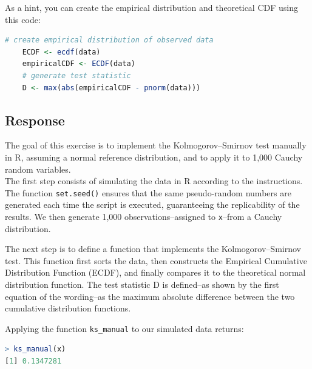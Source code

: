 \documentclass[12pt,letterpaper]{article}
\begin{document}
	
\noindent As a hint, you can create the empirical distribution and theoretical CDF using this code:

\begin{lstlisting}[language=R]
	# create empirical distribution of observed data
	ECDF <- ecdf(data)
	empiricalCDF <- ECDF(data)
	# generate test statistic
	D <- max(abs(empiricalCDF - pnorm(data))) \end{lstlisting}
	
\vspace{0.5in}

\subsection*{Response}

\noindent The goal of this exercise is to implement the Kolmogorov–Smirnov test manually in R, assuming a normal reference distribution, and to apply it to 1,000 Cauchy random variables.\\

\noindent The first step consists of simulating the data in R according to the instructions. The function \texttt{set.seed()} ensures that the same pseudo-random numbers are generated each time the script is executed, guaranteeing the replicability of the results. We then generate 1,000 observations--assigned to \texttt{x}--from a Cauchy distribution.\\


\vspace{0.2in}

\noindent The next step is to define a function that implements the Kolmogorov–Smirnov test. This function first sorts the data, then constructs the Empirical Cumulative Distribution Function (ECDF), and finally compares it to the theoretical normal distribution function. The test statistic D is defined--as shown by the first equation of the wording--as the maximum absolute difference between the two cumulative distribution functions.

 
\vspace{0.2in}

\noindent Applying the function \texttt{ks\_manual} to our simulated data returns:

\begin{lstlisting}[language=R]
> ks_manual(x)
[1] 0.1347281 \end{lstlisting}
\vspace{0.2in}
\end{document}
